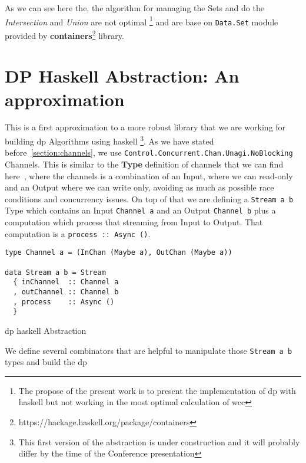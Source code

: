 \documentclass[12pt]{article}
\begin{document}
As we can see here the, the algorithm for managing the Sets and do the \textit{Intersection} and \textit{Union} are not optimal
\footnote{The propose of the present work is to present the implementation of \acrshort{dp} with \acrshort{haskell} but not working in the most optimal calculation of \acrshort{wcc}} and are base
on \texttt{Data.Set} module provided by \textbf{containers}\footnote{https://hackage.haskell.org/package/containers} library.

\section{DP Haskell Abstraction: An approximation}
This is a first approximation to a more robust library that we are working for building \acrshort{dp} Algorithms using \acrshort{haskell}
\footnote{This first version of the abstraction is under construction and it will probably differ by the time of the Conference presentation}.
As we have stated before~\ref{section:channels}, we use \texttt{Control.Concurrent.Chan.Unagi.NoBlocking} Channels. 
This is similar to the \textbf{Type} definition of channels that we can find here~\cite{parallel_book}, where the channels is a combination of an Input, where 
we can read-only and an Output where we can write only, avoiding as much as possible race conditions and concurrency issues.
On top of that we are defining a \texttt{Stream a b} Type which contains an Input \texttt{Channel a} and an Output \texttt{Channel b} 
plus a computation which process that streaming from Input to Output. That computation is a \texttt{process :: Async ()}.

\begin{listing}[H]
\begin{verbatim}  
type Channel a = (InChan (Maybe a), OutChan (Maybe a))

data Stream a b = Stream
  { inChannel  :: Channel a
  , outChannel :: Channel b
  , process    :: Async ()
  }

\end{verbatim}
\caption{\acrshort{dp} \acrshort{haskell} Abstraction}
\label{src:haskell:4}
\end{listing}

We define several combinators that are helpful to manipulate those \texttt{Stream a b} types and build the \acrshort{dp}
\end{document}
